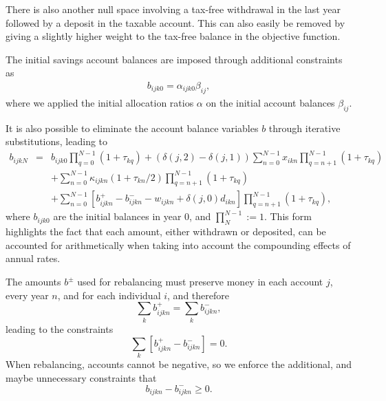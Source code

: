 \documentclass{article}[fleqn,12pt]
\begin{document}
	There is also another null space involving a tax-free withdrawal in the last year
	followed by a deposit in the taxable account. This can also easily be removed
	by giving a slightly higher weight to the tax-free balance in the objective function.

	The initial savings account balances are imposed through additional constraints as
	\begin{eqnarray}
		\label{Eq:InitialBalance}
		b_{ijk0} = \alpha_{ijk0}\beta_{ij},
	\end{eqnarray}
	where we applied the initial allocation ratios $\alpha$ on the initial account balances $\beta_{ij}$.

	It is also possible to eliminate the account balance variables $b$ through iterative
	substitutions, leading to
	\begin{eqnarray}
		\label{Eq:C3c}
		b_{ijkN} &=& b_{ijk0}\prod_{q=0}^{N-1} (1 + \tau_{kq})
		+ (\delta(j, 2) - \delta(j, 1)) \sum_{n=0}^{N-1} 
		x_{ikn} \prod_{q=n+1}^{N-1} (1 + \tau_{kq})
		\nonumber \\
		&&+ \sum_{n=0}^{N-1} \kappa_{ijkn}(1 + \tau_{kn}/2)\prod_{q=n+1}^{N-1} (1 + \tau_{kq})
		\nonumber \\
		&& + \sum_{n=0}^{N-1} [ b^+_{ijkn} - b^-_{ijkn} - w_{ijkn} + \delta(j, 0) d_{ikn}]
		\prod_{q=n+1}^{N-1} (1 + \tau_{kq}),
	\end{eqnarray}
	where $b_{ijk0}$ are the initial balances in year 0, and $\prod_{N}^{N-1} := 1$. This form
	highlights the fact that each amount, either withdrawn or deposited, can be accounted
	for arithmetically when taking into account the compounding effects of annual rates.

	The amounts $b^{\pm}$ used for rebalancing must preserve money in each account $j$, every year $n$,
	and for each individual $i$, and therefore
	\begin{equation}
		\sum_k b^+_{ijkn} = \sum _k b^-_{ijkn},
	\end{equation}
	leading to the constraints
	\begin{equation}
		\label{Eq:NoNewMoney}
		\sum_k [b^+_{ijkn} - b^-_{ijkn}] = 0.
	\end{equation}
	When rebalancing, accounts cannot be negative, so we enforce the additional, and maybe
	unnecessary constraints that
	\begin{equation}
		\label{Eq:EnoughMoney}
		b_{ijkn} - b^-_{ijkn} \geq 0.
	\end{equation}
\end{document}
